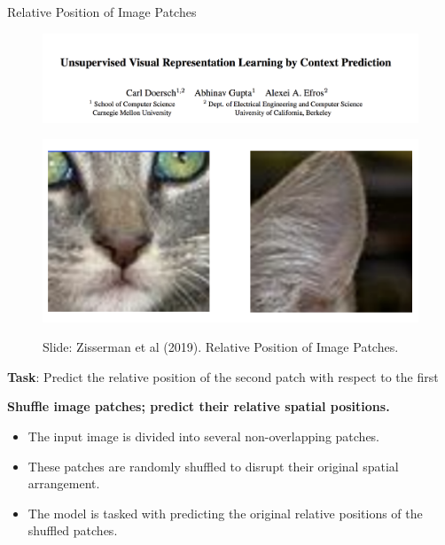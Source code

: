 \begin{frame}[allowframebreaks]{Relative Position of Image Patches}
    \begin{figure}
        \centering
        \includegraphics[width=1\linewidth,height=\textheight,keepaspectratio]{images/ssl/slide_29_2_img.png}
    \end{figure}
    \begin{figure}
        \centering
        \includegraphics[width=0.5\linewidth,height=0.6\textheight,keepaspectratio]{images/ssl/slide_29_1_img.png}
        
        Slide: Zisserman et al (2019). Relative Position of Image Patches.
    \end{figure}

    \textbf{Task}: Predict the relative position of the second patch with respect to the first


    \framebreak

    \textbf{Shuffle image patches; predict their relative spatial positions.}
    \begin{itemize}
        \item The input image is divided into several non-overlapping patches.
        \item These patches are randomly shuffled to disrupt their original spatial arrangement.
        \item The model is tasked with predicting the original relative positions of the shuffled patches.
    \end{itemize}

    \framebreak


\end{frame}
